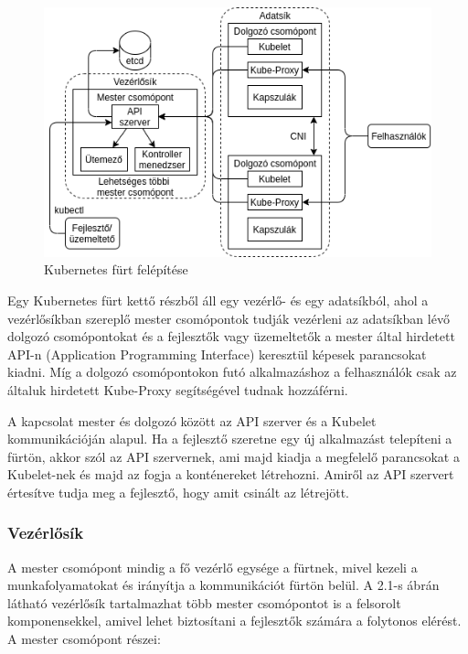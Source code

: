 \begin{figure}[!ht]
	\centering
	\includegraphics[width=1\textwidth, keepaspectratio]{figures/k8s_architecture.png}
	\caption{Kubernetes fürt felépítése}
	\label{fig:HVSpaces}
\end{figure}

Egy Kubernetes fürt kettő részből áll egy vezérlő- és egy adatsíkból, ahol a 
vezérlősíkban szereplő mester csomópontok tudják vezérleni az adatsíkban 
lévő dolgozó csomópontokat és a fejlesztők vagy üzemeltetők a mester által
hirdetett API-n (Application Programming Interface) keresztül képesek parancsokat
kiadni. Míg a dolgozó csomópontokon futó alkalmazáshoz a felhasználók csak az 
általuk hirdetett Kube-Proxy segítségével tudnak hozzáférni. 

A kapcsolat mester és dolgozó között az API szerver és a Kubelet kommunikációján
alapul. Ha a fejlesztő szeretne egy új alkalmazást telepíteni a fürtön, akkor
szól az API szervernek, ami majd kiadja a megfelelő parancsokat a Kubelet-nek 
és majd az fogja a konténereket létrehozni. Amiről az API szervert értesítve 
tudja meg a fejlesztő, hogy amit csinált az létrejött.

\subsubsection{Vezérlősík}

A mester csomópont mindig a fő vezérlő egysége a fürtnek, mivel kezeli a 
munkafolyamatokat és irányítja a kommunikációt fürtön belül. A 2.1-s ábrán
látható vezérlősík tartalmazhat  több mester csomópontot is a felsorolt 
komponensekkel, amivel lehet biztosítani a fejlesztők számára a folytonos 
elérést. A mester csomópont részei: 

